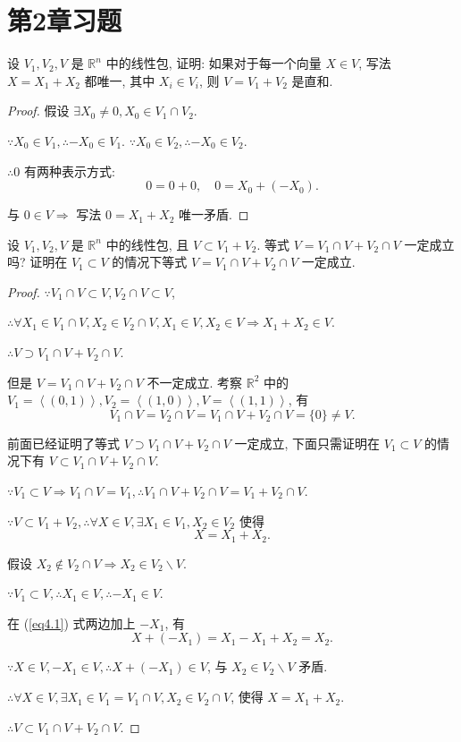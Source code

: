 \documentclass{ctexart}
\begin{document}
\section{第2章习题}
\begin{exercise}[1.1]
    设 $V_1,V_2,V$ 是 $\mathbb{R}^n$ 中的线性包, 证明: 如果对于每一个向量 $X\in V$, 写法 $X=X_1+X_2$ 都唯一, 其中 $X_i\in V_i$, 则 $V=V_1+V_2$ 是直和.
\end{exercise}
\begin{proof}
    假设 $\exists X_0\neq0,X_0\in V_1\cap V_2$.

    $\because X_0\in V_1,\therefore-X_0\in V_1$. $\because X_0\in V_2,\therefore-X_0\in V_2$.

    $\therefore0$ 有两种表示方式:
    \[0=0+0,\quad0=X_0+(-X_0).\]

    与 $0\in V\Rightarrow$ 写法 $0=X_1+X_2$ 唯一矛盾.
\end{proof}
\begin{exercise}[1.2]
    设 $V_1,V_2,V$ 是 $\mathbb{R}^n$ 中的线性包, 且 $V\subset V_1+V_2$. 等式 $V=V_1\cap V+V_2\cap V$ 一定成立吗? 证明在 $V_1\subset V$ 的情况下等式 $V=V_1\cap V+V_2\cap V$ 一定成立.
\end{exercise}
\begin{proof}
    $\because V_1\cap V\subset V,V_2\cap V\subset V$,

    $\therefore\forall X_1\in V_1\cap V,X_2\in V_2\cap V,X_1\in V,X_2\in V\Rightarrow X_1+X_2\in V$.

    $\therefore V\supset V_1\cap V+V_2\cap V$.

    但是 $V=V_1\cap V+V_2\cap V$ 不一定成立. 考察 $\mathbb{R}^2$ 中的 $V_1=\left<(0,1)\right>,V_2=\left<(1,0)\right>,V=\left<(1,1)\right>$, 有
    \[V_1\cap V=V_2\cap V=V_1\cap V+V_2\cap V=\{0\}\neq V.\]

    前面已经证明了等式 $V\supset V_1\cap V+V_2\cap V$ 一定成立, 下面只需证明在 $V_1\subset V$ 的情况下有 $V\subset V_1\cap V+V_2\cap V$.

    $\because V_1\subset V\Rightarrow V_1\cap V=V_1,\therefore V_1\cap V+V_2\cap V=V_1+V_2\cap V$.

    $\because V\subset V_1+V_2,\therefore\forall X\in V,\exists X_1\in V_1,X_2\in V_2$ 使得
    \begin{equation}\label{eq4.1}
        X=X_1+X_2.
    \end{equation}

    假设 $X_2\notin V_2\cap V\Rightarrow X_2\in V_2\backslash V$.

    $\because V_1\subset V,\therefore X_1\in V,\therefore-X_1\in V$.

    在 (\ref{eq4.1}) 式两边加上 $-X_1$, 有
    \[X+(-X_1)=X_1-X_1+X_2=X_2.\]

    $\because X\in V,-X_1\in V,\therefore X+(-X_1)\in V$, 与 $X_2\in V_2\backslash V$ 矛盾.

    $\therefore\forall X\in V,\exists X_1\in V_1=V_1\cap V,X_2\in V_2\cap V$, 使得 $X=X_1+X_2$.

    $\therefore V\subset V_1\cap V+V_2\cap V.$
\end{proof}
\end{document}
